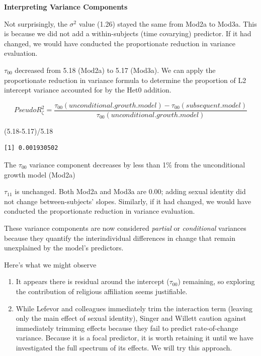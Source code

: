 \documentclass[
  english,
]{book}
\newenvironment{Shaded}{\begin{snugshade}}{\end{snugshade}}
\newcommand{\FloatTok}[1]{\textcolor[rgb]{0.00,0.00,0.81}{#1}}
\newcommand{\NormalTok}[1]{#1}
\newcommand{\SpecialCharTok}[1]{\textcolor[rgb]{0.00,0.00,0.00}{#1}}
\providecommand{\tightlist}{%
  \setlength{\itemsep}{0pt}\setlength{\parskip}{0pt}}
\begin{document}
\textbf{Interpreting Variance Components}

Not surprisingly, the \(\sigma ^{2}\) value (1.26) stayed the same from Mod2a to Mod3a. This is because we did not add a within-subjects (time covarying) predictor. If it had changed, we would have conducted the proportionate reduction in variance evaluation.

\(\tau _{00}\) decreased from 5.18 (Mod2a) to 5.17 (Mod3a). We can apply the proportionate reduction in variance formula to determine the proportion of L2 intercept variance accounted for by the Het0 addition.

\[Pseudo R_{\zeta }^{2} = \frac{\tau _{00} (unconditional. growth. model) - \tau _{00}(subsequent. model)}{\tau _{00}(unconditional. growth. model)}\]

\begin{Shaded}
\begin{Highlighting}[]
\NormalTok{(}\FloatTok{5.18{-}5.17}\NormalTok{)}\SpecialCharTok{/}\FloatTok{5.18}
\end{Highlighting}
\end{Shaded}

\begin{verbatim}
[1] 0.001930502
\end{verbatim}

The \(\tau _{00}\) variance component decreases by less than 1\% from the unconditional growth model (Mod2a)

\(\tau _{11}\) is unchanged. Both Mod2a and Mod3a are 0.00; adding sexual identity did not change between-subjects' slopes. Similarly, if it had changed, we would have conducted the proportionate reduction in variance evaluation.

These variance components are now considered \emph{partial} or \emph{conditional} variances because they quantify the interindividual differences in change that remain unexplained by the model's predictors.

Here's what we might observe

\begin{enumerate}
\def\labelenumi{\arabic{enumi}.}
\tightlist
\item
  It appears there is residual around the intercept (\(\tau _{00}\)) remaining, so exploring the contribution of religious affiliation seems justifiable.
\item
  While Lefevor and colleagues \citeyearpar{lefevor_religious_2017} immediately trim the interaction term (leaving only the main effect of sexual identity), Singer and Willett \citeyearpar{singer_applied_2003} caution against immediately trimming effects because they fail to predict rate-of-change variance. Because it is a focal predictor, it is worth retaining it until we have investigated the full spectrum of its effects. We will try this approach.
\end{enumerate}
\end{document}
